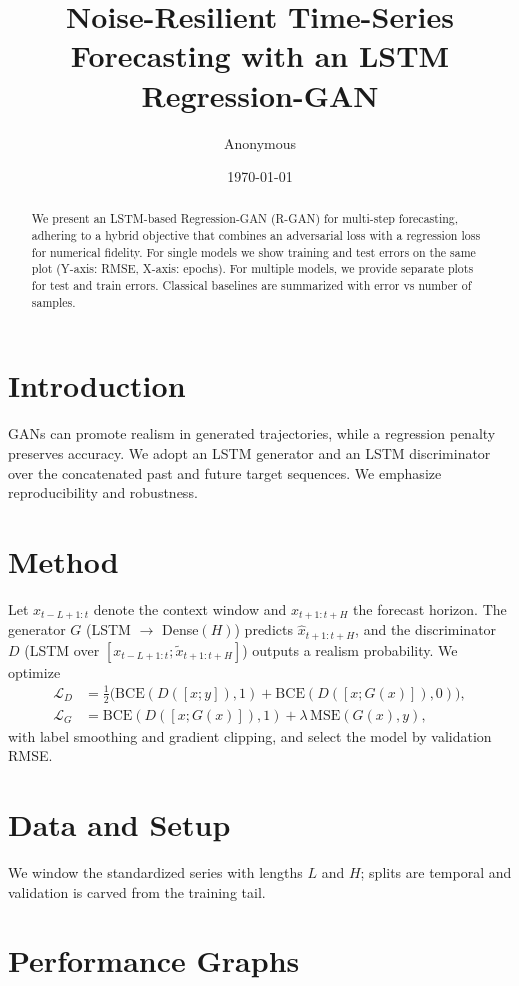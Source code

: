 \documentclass[11pt]{article}
\title{Noise-Resilient Time-Series Forecasting with an LSTM Regression-GAN}
\author{Anonymous}
\date{\today}
\begin{document}
\maketitle

\begin{abstract}
We present an LSTM-based Regression-GAN (R-GAN) for multi-step forecasting, adhering to a hybrid objective that combines an adversarial loss with a regression loss for numerical fidelity. For single models we show training and test errors on the same plot (Y-axis: RMSE, X-axis: epochs). For multiple models, we provide separate plots for test and train errors. Classical baselines are summarized with error vs number of samples.
\end{abstract}

\section{Introduction}
GANs can promote realism in generated trajectories, while a regression penalty preserves accuracy. We adopt an LSTM generator and an LSTM discriminator over the concatenated past and future target sequences. We emphasize reproducibility and robustness.

\section{Method}
Let $x_{t-L+1:t}$ denote the context window and $x_{t+1:t+H}$ the forecast horizon. The generator $G$ (LSTM $\rightarrow$ Dense$(H)$) predicts $\hat{x}_{t+1:t+H}$, and the discriminator $D$ (LSTM over $[x_{t-L+1:t}; \tilde{x}_{t+1:t+H}]$) outputs a realism probability. We optimize
\begin{align}
\mathcal{L}_D &= \tfrac{1}{2}\Big(\mathrm{BCE}(D([x;y]),1) + \mathrm{BCE}(D([x;G(x)]),0)\Big),\\
\mathcal{L}_G &= \mathrm{BCE}(D([x;G(x)]),1) + \lambda\,\mathrm{MSE}\!\left(G(x), y\right),
\end{align}
with label smoothing and gradient clipping, and select the model by validation RMSE.

\section{Data and Setup}
We window the standardized series with lengths $L$ and $H$; splits are temporal and validation is carved from the training tail.

\section{Performance Graphs}
\end{document}
